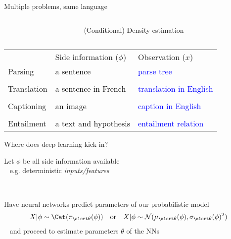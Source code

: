 \begin{frame}{Multiple problems, same language}



\begin{small}

\begin{columns}
\begin{column}{0.3\textwidth}
\end{column}
\begin{column}{0.6\textwidth}
\alert{(Conditional) Density estimation}
\end{column}

\end{columns}

\begin{tabular}{p{2cm} p{4cm} p{4cm}}
 & Side information ($\phi$) & Observation ($x$) \\ \cline{2-3}
Parsing &   \textcolor{black}{a sentence} & \textcolor{blue}{parse tree} \\
&&\\
Translation &  \textcolor{black}{a sentence in French} & \textcolor{blue}{translation in English} \\
&&\\
Captioning &  \textcolor{black}{an image} & \textcolor{blue}{caption in English} \\
&&\\
Entailment  & \textcolor{black}{a text and hypothesis} & \textcolor{blue}{entailment relation}
\end{tabular}
\end{small}

\end{frame}

\begin{frame}{Where does deep learning kick in?}

Let $\phi$ be all side information available\\
~ e.g. deterministic \emph{inputs/features}

~ \pause

Have neural networks predict parameters of our probabilistic model
	\begin{align*}
    X|\phi \sim \Cat(\pi_{\alert \theta}(\phi)) & & \text{or} & & X|\phi \sim \mathcal N(\mu_{\alert \theta}(\phi), \sigma_{\alert \theta}(\phi)^2)
    \end{align*} \pause
~ and proceed to \alert{estimate parameters} $\theta$ of the NNs %

 





\end{frame}


